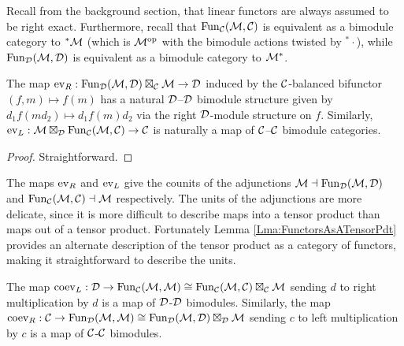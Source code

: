 \documentclass{amsart}
\begin{document}
Recall from the background section, that linear functors are always assumed to be right exact.  Furthermore, recall that $\operatorname{Fun}_{{\mathcal C}}(\mathcal M, \mathcal C)$ is equivalent as a bimodule category to ${}^*\mathcal M$ (which is $\mathcal M^{\mathrm{op}}$ with the bimodule actions twisted by ${}^*\cdot$), while $\operatorname{Fun}_{\mathcal D}(\mathcal M, \mathcal D)$ is equivalent as a bimodule category to $\mathcal M^*$.

\begin{lemma}
The map $\mathrm{ev}_R: \operatorname{Fun}_{{\mathcal D}}(\mathcal M, \mathcal D) \boxtimes_{\mathcal C} \mathcal M \rightarrow \mathcal D$ induced by the $\mathcal C$-balanced bifunctor $(f,m) \mapsto f(m)$ has a natural $\mathcal D$--$\mathcal D$ bimodule structure given by $d_1 f(m d_2)  \mapsto d_1 f(m) d_2$ via the right $\mathcal D$-module structure on $f$.  Similarly, $\mathrm{ev}_L: \mathcal M \boxtimes_{\mathcal D} \operatorname{Fun}_{\mathcal C}(\mathcal M, \mathcal C) \rightarrow \mathcal C$ is naturally a map of $\mathcal C$--$\mathcal C$ bimodule categories.
\end{lemma} 
\begin{proof}
Straightforward. 
\end{proof}

The maps $\mathrm{ev}_R$ and $\mathrm{ev}_L$ give the counits of the adjunctions $\mathcal M \dashv \operatorname{Fun}_{{\mathcal D}}(\mathcal M, \mathcal D)$ and $\operatorname{Fun}_{\mathcal C}(\mathcal M,\mathcal C) \dashv \mathcal M$ respectively.  The units of the adjunctions are more delicate, since it is more difficult to describe maps into a tensor product than maps out of a tensor product. Fortunately Lemma \ref{Lma:FunctorsAsATensorPdt} provides an alternate description of the tensor product as a category of functors, making it straightforward  to describe the units.


\begin{lemma}
The map $\mathrm{coev}_L: \mathcal D \rightarrow \operatorname{Fun}_{\mathcal C}(\mathcal M,\mathcal M) \cong \operatorname{Fun}_{\mathcal C}(\mathcal M,\mathcal C) \boxtimes_\mathcal C \mathcal M$ sending $d$ to right multiplication by $d$ is a map of $\mathcal D$-$\mathcal D$ bimodules.  Similarly, the map $\mathrm{coev}_R: \mathcal C \rightarrow \operatorname{Fun}_{\mathcal D}(\mathcal M,\mathcal M) \cong \operatorname{Fun}_{\mathcal D}(\mathcal M,\mathcal D) \boxtimes_\mathcal D \mathcal M$ sending $c$ to left multiplication by $c$ is a map of $\mathcal C$-$\mathcal C$ bimodules.
\end{lemma}
\end{document}
